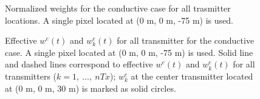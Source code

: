 \documentclass[extra,mreferee]{gji}
\begin{document}
\begin{figure}
  \caption{Normalized weights for the conductive case for all trasmitter locations. A single pixel located at (0 m, 0 m, -75 m) is used. }
  \label{F:NormalizedWeights}
\end{figure}

\begin{figure}
  \caption{Effective $w^e(t)$ and $w^e_k(t)$ for all transmitter for the conductive case. A single pixel located at (0 m, 0 m, -75 m) is used.  Solid line and dashed lines correspond to effective $w^e(t)$ and $w^e_k(t)$ for all transmitters ($k=1,\ \ldots,\ nTx$); $w^e_k$ at the center transmitter located at (0 m, 0 m, 30 m) is marked as solid circles. }
  \label{F:AveragedWe}
\end{figure}
\clearpage
\end{document}

